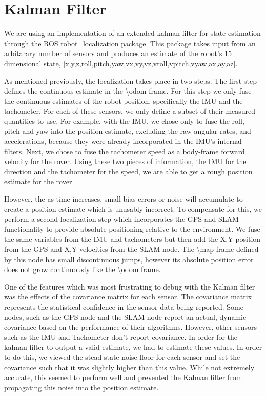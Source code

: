 \section{Kalman Filter}

We are using an implementation of an extended kalman filter for state estimation through the ROS robot\_localization package. This package takes input from an arbitarary number of sensors and produces an estimate of the robot's 15 dimensional state, [x,y,z,roll,pitch,yaw,vx,vy,vz,vroll,vpitch,vyaw,ax,ay,az]\cite{Moore2016}. 

As mentioned previously, the localization takes place in two steps. The first step defines the continuous estimate in the \textbackslash odom frame. For this step we only fuse the continuous estimates of the robot position, specifically the IMU and the tachometer. For each of these sensors, we only define a subset of their measured quantities to use. For example, with the IMU, we chose only to fuse the roll, pitch and yaw into the position estimate, excluding the raw angular rates, and accelerations, because they were already incorporated in the IMU's internal filters. Next, we chose to fuse the tachometer speed as a body-frame forward velocity for the rover. Using these two pieces of information, the IMU for the direction and the tachometer for the speed, we are able to get a rough position estimate for the rover. 

However, the as time increases, small bias errors or noise will accumulate to create a position estimate which is unusably incorrect. To compensate for this, we perform a second localization step which incorporates the GPS and SLAM functionality to provide absolute positioning relative to the environment. We fuse the same variables from the IMU and tachometers but then add the X,Y position from the GPS and X,Y velocities from the SLAM node. The \textbackslash map frame defined by this node has small discontinuous jumps, however its absolute position error does not grow continuously like the \textbackslash odom frame.

One of the features which was most frustrating to debug with the Kalman filter was the effects of the covariance matrix for each sensor. The covariance matrix represents the statistical confidence in the sensor data being reported. Some nodes, such as the GPS node and the SLAM node report an actual, dynamic covariance based on the performance of their algorithms. However, other sensors such as the IMU and Tachometer don't report covariance. In order for the kalman filter to output a valid estimate, we had to estimate these values. In order to do this, we viewed the stead state noise floor for each sensor and set the covariance such that it was slightly higher than this value. While not extremely accurate, this seemed to perform well and prevented the Kalman filter from propagating this noise into the position estimate.

